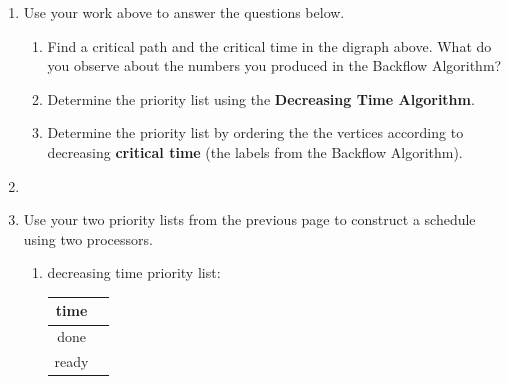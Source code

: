 \documentclass[12pt]{article}
\renewcommand{\emph}[1]{\textsf{\textbf{#1}}}
\begin{document}
\begin{enumerate}
\item Use your work above to answer the questions below.
	\begin{enumerate}
	\item Find a critical path and the critical time in the digraph above. What do you observe about the numbers you produced in the Backflow Algorithm?
	\vfill
	\item Determine the priority list using the \emph{Decreasing Time Algorithm}.
	\vfill
	\item Determine the priority list by ordering the the vertices according to decreasing \emph{critical time} (the labels from the Backflow Algorithm).
	\vfill
	\end{enumerate}
\newpage
\item {}
\vspace{.5in}
\item Use your two priority lists from the previous page to construct a schedule using two processors.\\
	\begin{enumerate}
	\item decreasing time priority list: \underline{\hspace{2in}}\\
	
\hspace*{-1in}	\begin{tabular}{c || c}
time &   \quad \hspace{6in} \quad \\ \hline
done& \\ \hline
ready& \\ \hline
\end{tabular}

\vfill
	

\end{enumerate}
\end{enumerate}
\end{document}
